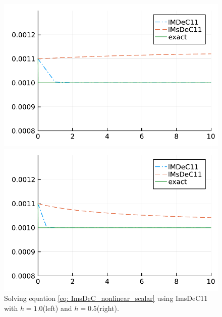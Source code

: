 \begin{figure}[!h]
	\centering
	\begin{minipage}[t]{0.45\textwidth}
		\includegraphics[width=\textwidth]{pdf/odepics/BspImsDeC/sol_ImsDeC11_GLB_nonlinear1.pdf}
	\end{minipage}
	\begin{minipage}[t]{0.45\textwidth}
		\includegraphics[width=\textwidth]{pdf/odepics/BspImsDeC/sol_ImsDeC11_GLB_nonlinear2.pdf}
	\end{minipage}
	\caption{Solving equation \eqref{eq: ImsDeC_nonlinear_scalar} using ImsDeC11 with $h=1.0$(left) and $h=0.5$(right).}
	\label{fig: exaImsDeC4}
\end{figure}

